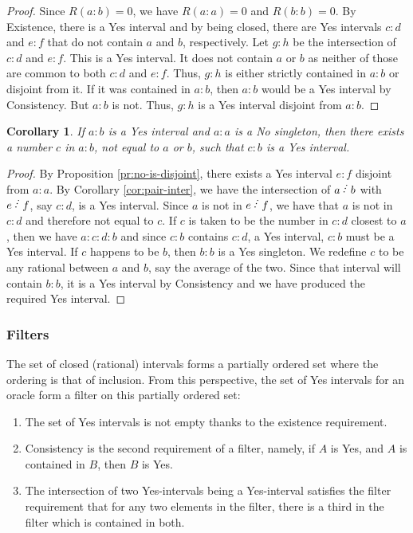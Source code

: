 \documentclass[12pt]{article}
\newtheorem{corollary}{Corollary}[subsection]
\begin{document}
\begin{proof}
    Since $R(a:b) = 0$, we have $R(a:a) = 0$ and $R(b:b) = 0$. By Existence, there is a Yes interval and by being closed, there are Yes intervals $c:d$ and $e:f$ that do not contain $a$ and $b$, respectively. Let $g:h$ be the intersection of $c:d$ and $e:f$. This is a Yes interval. It does not contain $a$ or $b$ as neither of those are common to both $c:d$ and $e:f$. Thus, $g:h$ is either strictly contained in $a:b$ or disjoint from it. If it was contained in $a:b$, then $a:b$ would be a Yes interval by Consistency. But $a:b$ is not. Thus, $g:h$ is a Yes interval disjoint from $a:b$.
\end{proof}

\begin{corollary}\label{cor:exclude-singleton}
    If $a : b$ is a Yes interval and $a:a$ is a No singleton, then there exists a number $c$ in $a:b$, not equal to $a$ or $b$, such that $c : b$ is a Yes interval.
\end{corollary}

\begin{proof}
    By Proposition \ref{pr:no-is-disjoint}, there exists a Yes interval $e : f$ disjoint from $a:a$. By Corollary \ref{cor:pair-inter}, we have the intersection of $a\lte b$ with $e\lte f$, say $c:d$, is a Yes interval. Since $a$ is not in $e\lte f$, we have that $a$ is not in $c:d$ and therefore not equal to $c$.  If $c$ is taken to be the number in $c:d$ closest to $a$, then we have $a:c:d:b$ and since $c:b$ contains $c:d$, a Yes interval, $c:b$ must be a Yes interval.  If $c$ happens to be $b$, then $b:b$ is a Yes singleton. We redefine $c$ to be any rational between $a$ and $b$, say the average of the two. Since that interval will contain $b:b$, it is a Yes interval by Consistency and we have produced the required Yes interval. 
\end{proof}

\subsubsection{Filters}

The set of closed (rational) intervals forms a partially ordered set where the ordering is that of inclusion. From this perspective, the set of Yes intervals for an oracle form a filter on this partially ordered set: 
\begin{enumerate}
    \item The set of Yes intervals is not empty thanks to the existence requirement. 
    \item Consistency is the second requirement of a filter, namely, if $A$ is Yes, and $A$ is contained in $B$, then $B$ is Yes.
    \item The intersection of two Yes-intervals being a Yes-interval satisfies the filter requirement that for any two elements in the filter, there is a third in the filter which is contained in both. 
\end{enumerate}
\end{document}
